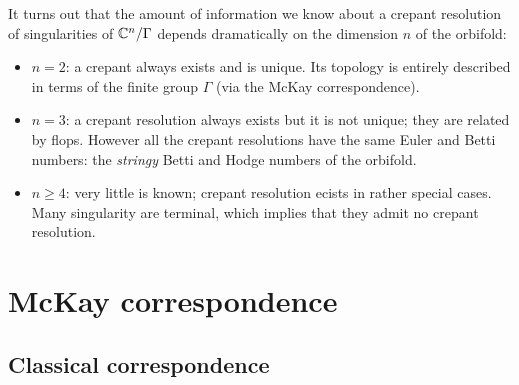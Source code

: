         It turns out that the amount of information we know about a crepant resolution of singularities of $\mathbb{C}^n/\Gamma$ depends dramatically on the dimension $n$ of the orbifold:
        \begin{itemize}
            \item $n=2$: a crepant always exists and is unique. Its topology is entirely described in terms of the finite group $\Gamma$ (via the McKay correspondence).
            \item $n=3$: a crepant resolution always exists but it is not unique; they are related by flops. However all the crepant resolutions have the same Euler and Betti numbers: the \emph{stringy} Betti and Hodge numbers of the orbifold.
            \item $n\geq4$: very little is known; crepant resolution ecists in rather special cases. Many singularity are terminal, which implies that they admit no crepant resolution.
        \end{itemize}

\section{McKay correspondence}\label{app:McKay}

    \subsection{Classical correspondence}

